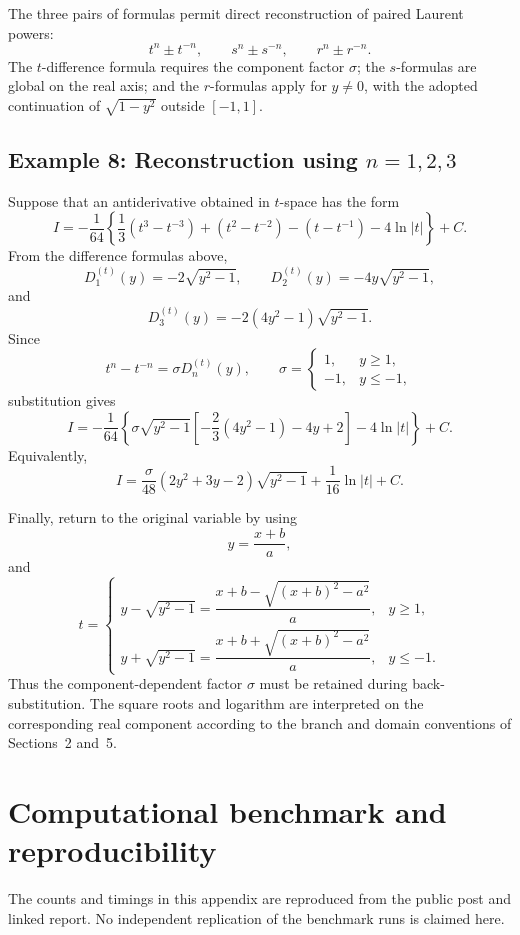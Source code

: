 \documentclass[11pt]{article}
\theoremstyle{remark}
\begin{document}
The three pairs of formulas permit direct reconstruction of paired Laurent powers:
\[
t^n\pm t^{-n},
\qquad
s^n\pm s^{-n},
\qquad
r^n\pm r^{-n}.
\]
The $t$-difference formula requires the component factor $\sigma$; the $s$-formulas are global on the real axis; and the $r$-formulas apply for $y\ne0$, with the adopted continuation of $\sqrt{1-y^2}$ outside $[-1,1]$.

\subsection*{Example 8: Reconstruction using \(n=1,2,3\)}

Suppose that an antiderivative obtained in \(t\)-space has the form
\[
I=
-\frac{1}{64}
\left\{
\frac{1}{3}\left(t^3-t^{-3}\right)
+\left(t^2-t^{-2}\right)
-\left(t-t^{-1}\right)
-4\ln|t|
\right\}
+C.
\]
From the difference formulas above,
\[
D^{(t)}_1(y)=-2\sqrt{y^2-1},
\qquad
D^{(t)}_2(y)=-4y\sqrt{y^2-1},
\]
and
\[
D^{(t)}_3(y)
=-2(4y^2-1)\sqrt{y^2-1}.
\]
Since
\[
t^n-t^{-n}=\sigma D^{(t)}_n(y),
\qquad
\sigma=
\begin{cases}
1, & y\ge 1,\\
-1, & y\le -1,
\end{cases}
\]
substitution gives
\[
I=
-\frac{1}{64}
\left\{
\sigma\sqrt{y^2-1}
\left[
-\frac{2}{3}(4y^2-1)-4y+2
\right]
-4\ln|t|
\right\}
+C.
\]
Equivalently,
\[
I=
\frac{\sigma}{48}
(2y^2+3y-2)\sqrt{y^2-1}
+\frac{1}{16}\ln|t|
+C.
\]

Finally, return to the original variable by using
\[
y=\frac{x+b}{a},
\]
and
\[
t=
\begin{cases}
y-\sqrt{y^2-1}
=
\dfrac{x+b-\sqrt{(x+b)^2-a^2}}{a},
& y\ge 1,\\[10pt]
y+\sqrt{y^2-1}
=
\dfrac{x+b+\sqrt{(x+b)^2-a^2}}{a},
& y\le -1.
\end{cases}
\]
Thus the component-dependent factor \(\sigma\) must be retained during
back-substitution. The square roots and logarithm are interpreted on the
corresponding real component according to the branch and domain conventions
of Sections~2 and~5.

\section{Computational benchmark and reproducibility}
\label{app:benchmark}

The counts and timings in this appendix are reproduced from the public post and linked report. No independent replication of the benchmark runs is claimed here.
\end{document}
